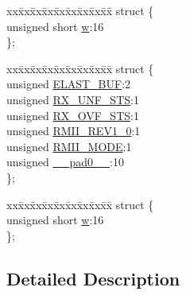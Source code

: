 \begin{DoxyCompactItemize}
\begin{tabbing}
\end{tabbing}\item 
\begin{tabbing}
xx\=xx\=xx\=xx\=xx\=xx\=xx\=xx\=xx\=\kill
struct \{\\
\>unsigned short \hyperlink{union_____r_m_i_i_b_y_p_a_s_sbits__t_a160850a4684a3e82c2323033964f2e98}{w}:16\\
\}; \\

\end{tabbing}\item 
\begin{tabbing}
xx\=xx\=xx\=xx\=xx\=xx\=xx\=xx\=xx\=\kill
struct \{\\
\>unsigned \hyperlink{union_____r_m_i_i_b_y_p_a_s_sbits__t_a587d3bc3a6b72615806422bb98b4b358}{ELAST\_BUF}:2\\
\>unsigned \hyperlink{union_____r_m_i_i_b_y_p_a_s_sbits__t_a6885d9bd271ec74616e7c66bf2b4bb97}{RX\_UNF\_STS}:1\\
\>unsigned \hyperlink{union_____r_m_i_i_b_y_p_a_s_sbits__t_a42892a1cd9bf8f9300de79e7027ab384}{RX\_OVF\_STS}:1\\
\>unsigned \hyperlink{union_____r_m_i_i_b_y_p_a_s_sbits__t_aa5de637fe9c35ea9f6bbfe246b269ad2}{RMII\_REV1\_0}:1\\
\>unsigned \hyperlink{union_____r_m_i_i_b_y_p_a_s_sbits__t_a20b8da6446fb0fd157b6fdeece4b4452}{RMII\_MODE}:1\\
\>unsigned \hyperlink{union_____r_m_i_i_b_y_p_a_s_sbits__t_adf71f3d8410c1f1dbbc96680a92c49af}{\_\_pad0\_\_}:10\\
\}; \\

\end{tabbing}\item 
\begin{tabbing}
xx\=xx\=xx\=xx\=xx\=xx\=xx\=xx\=xx\=\kill
struct \{\\
\>unsigned short \hyperlink{union_____r_m_i_i_b_y_p_a_s_sbits__t_a160850a4684a3e82c2323033964f2e98}{w}:16\\
\}; \\

\end{tabbing}\end{DoxyCompactItemize}


\subsection{Detailed Description}


